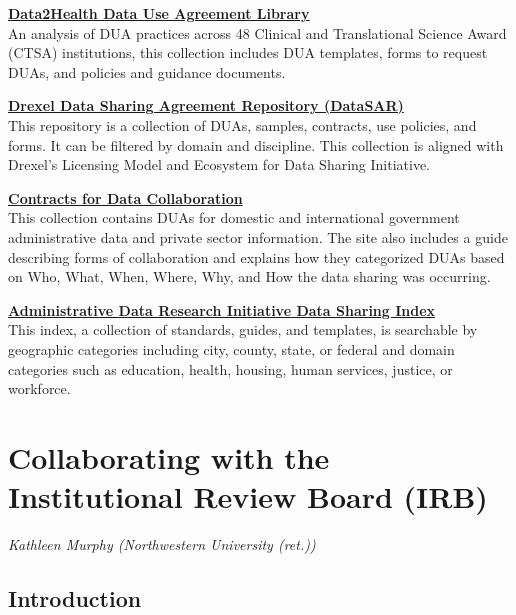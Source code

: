 \documentclass[
]{book}
\begin{document}
\textbf{\href{https://github.com/data2health/governance-pathways/blob/master/library.md}{Data2Health Data Use Agreement Library}}\\
An analysis of DUA practices across 48 Clinical and Translational Science Award (CTSA) institutions, this collection includes DUA templates, forms to request DUAs, and policies and guidance documents.

\textbf{\href{http://datasar.cci.drexel.edu/index.html}{Drexel Data Sharing Agreement Repository (DataSAR)}}\\
This repository is a collection of DUAs, samples, contracts, use policies, and forms. It can be filtered by domain and discipline. This collection is aligned with Drexel's Licensing Model and Ecosystem for Data Sharing Initiative.

\textbf{\href{https://contractsfordatacollaboration.org/library/}{Contracts for Data Collaboration}}\\
This collection contains DUAs for domestic and international government administrative data and private sector information. The site also includes a guide describing forms of collaboration and explains how they categorized DUAs based on Who, What, When, Where, Why, and How the data sharing was occurring.

\textbf{\href{https://adri.georgetown.edu/}{Administrative Data Research Initiative Data Sharing Index}}\\
This index, a collection of standards, guides, and templates, is searchable by geographic categories including city, county, state, or federal and domain categories such as education, health, housing, human services, justice, or workforce.

\hypertarget{irb}{%
\chapter{Collaborating with the Institutional Review Board (IRB)}\label{irb}}

\emph{Kathleen Murphy (Northwestern University (ret.))}

\hypertarget{introduction}{%
\section{Introduction}\label{introduction}}
\end{document}
